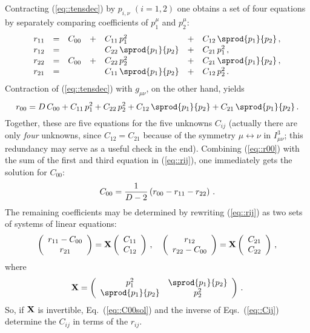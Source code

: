 %
Contracting (\ref{eq::tensdec}) by $p_{i,\nu}$ $(i=1,2)$ one obtains
a set of four equations by separately comparing coefficients of
$p_1^\mu$ and $p_2^\mu$:
%
\begin{equation}\label{eq::rij}
\begin{array}{lllllll}
r_{11}&=&C_{00} & + & C_{11}\, p_1^2 & + & C_{12}\, \sprod{p_1}{p_2}\,,\\[.2ex]
r_{12}&=&       &   & C_{22}\, \sprod{p_1}{p_2} & + & C_{21}\, p_1^2\,,\\[.2ex]
r_{22}&=&C_{00} & + & C_{22}\, p_2^2 & + & C_{21}\, \sprod{p_1}{p_2}\,,\\[.2ex]
r_{21}&=&      &   & C_{11}\, \sprod{p_1}{p_2} & + & C_{12}\, p_2^2\,.
\end{array}
\end{equation}
%
Contraction of (\ref{eq::tensdec}) with $g_{\mu\nu}$, on the other hand,
yields
%
\begin{equation}\label{eq::r00}
r_{00} = D\,C_{00} + C_{11}\,p_1^2 + C_{22}\,p_2^2 +
C_{12}\,\sprod{p_1}{p_2} + C_{21}\, \sprod{p_1}{p_2}\,. 
\end{equation}
%
Together, these are five equations for the five unknowns $C_{ij}$
(actually there are only {\it four} unknowns, since $C_{12} = C_{21}$
because of the symmetry $\mu \leftrightarrow \nu$ in $I^3_{\mu\nu}$; this
redundancy may serve as a useful check in the end).
Combining (\ref{eq::r00}) with the sum of the first and third equation
in (\ref{eq::rij}), one immediately gets the solution for $C_{00}$:
%
\begin{equation}\label{eq::C00sol}
C_{00} = {1\over D-2}\left(r_{00} - r_{11} - r_{22}\right)\,.
\end{equation}
%
The remaining coefficients may be determined by rewriting
(\ref{eq::rij}) as two sets of systems of linear equations:
%
\begin{equation}\label{eq::Cij}
\left(
  \begin{array}{c}
    r_{11} - C_{00} \\
    r_{21}
  \end{array}
\right) =
{\bf X}
\left(
  \begin{array}{c}
    C_{11} \\
    C_{12}
  \end{array}
\right)\,,\quad
\left(
  \begin{array}{c}
    r_{12} \\
    r_{22} - C_{00}
  \end{array}
\right) =
{\bf X}
\left(
  \begin{array}{c}
    C_{21} \\
    C_{22}
  \end{array}
\right)\,,
\end{equation}
where
\begin{equation}
{\bf X} = \left(
\begin{array}{cc}
  p_1^2        & \sprod{p_1}{p_2} \\
  \sprod{p_1}{p_2} & p_2^2
\end{array}
\right)\,.
\end{equation}
%
So, if ${\bf X}$ is invertible, Eq.~(\ref{eq::C00sol}) and the inverse
of Eqs.~(\ref{eq::Cij}) determine the $C_{ij}$ in terms of the $r_{ij}$.

